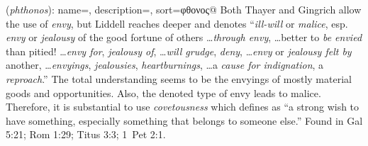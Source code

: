 \item[Covetousness,]

(\textit{phthonos}):
{
    name=,
    description={},
    sort=φθονος@
}
Both Thayer and Gingrich allow the use of \emph{envy}, but Liddell reaches deeper and denotes ``\emph{ill-will} or \emph{malice}, esp. \emph{envy} or \emph{jealousy} of the good fortune of others \ldots \emph{through envy}, \ldots better to \emph{be envied} than pitied! \ldots \emph{envy for}, \emph{jealousy of}, \ldots \emph{will grudge}, \emph{deny}, \ldots \emph{envy} or \emph{jealousy felt by} another, \ldots \emph{envyings}, \emph{jealousies}, \emph{heartburnings}, \ldots a \emph{cause for indignation}, a \emph{reproach}.'' The total understanding seems to be the envyings of mostly material goods and opportunities. Also, the denoted type of envy leads to malice. Therefore, it is substantial to use \emph{covetousness} which defines as ``a strong wish to have something, especially something that belongs to someone else.''
Found in Gal 5:21; Rom 1:29; Titus 3:3; 1~Pet 2:1.
